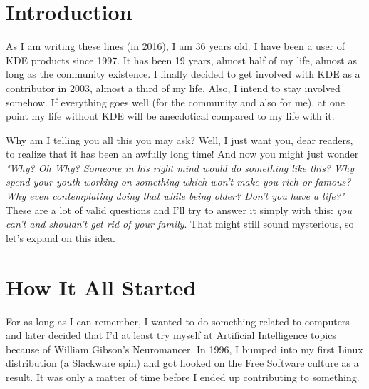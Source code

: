 

\section*{Introduction}
As I am writing these lines (in 2016), I am 36 years old. I have been a user of KDE
products since 1997. It has been 19 years, almost half of my life, almost
as long as the community existence. I finally decided to get involved with KDE
as a contributor in 2003, almost a third of my life. Also, I intend to stay
involved somehow. If everything goes well (for the community and also for me),
at one point my life without KDE will be anecdotical compared to my life with
it.

Why am I telling you all this you may ask? Well, I just want you, dear readers,
to realize that it has been an awfully long time! And now you might just wonder
\emph{"Why? Oh Why? Someone in his right mind would do something like this?
Why spend your youth working on something which won't make you rich or famous?
Why even contemplating doing that while being older? Don't you have a life?"} \\

These are a lot of valid questions and I'll try to answer it simply with this:
\emph{you can't and shouldn't get rid of your family}. That might still sound
mysterious, so let's expand on this idea.

\section*{How It All Started}
For as long as I can remember, I wanted to do something related to computers and
later decided that I'd at least try myself at Artificial Intelligence topics because of William Gibson's
Neuromancer. In 1996, I bumped into my first Linux distribution (a Slackware
spin) and got hooked on the Free Software culture as a result. It was only a
matter of time before I ended up contributing to something. \\

